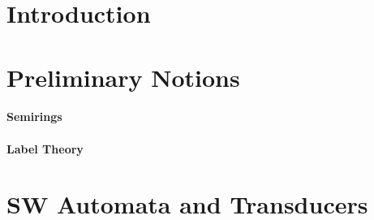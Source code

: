 \begin{abstract}

\end{abstract}





\section{Introduction} \label{sec:intro}




\section{Preliminary Notions}
\label{section:prelim}\label{sec:prelim}




\paragraph*{Semirings} 
\label{section:semiring}\label{sec:semiring}



\paragraph*{Label Theory}
\label{section:symbols}





\section{SW Automata and Transducers}
\label{section:transducer}\label{sec:transducer}
\label{section:SWA}\label{sec:SWA}
\label{section:SWT}\label{sec:SWT}


